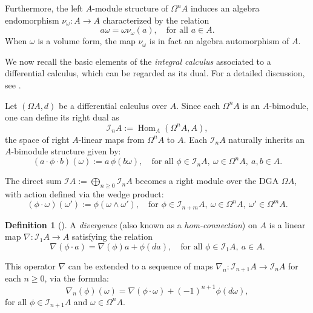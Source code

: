 \documentclass{amsart}
\theoremstyle{definition}
\newtheorem{definition}[theorem]{Definition}
\theoremstyle{remark}
\numberwithin{equation}{section}
\begin{document}
Furthermore, the left $A$-module structure of $\Omega^n A$ induces an algebra endomorphism $\nu_{\omega}: A \to A$ characterized by the relation
\begin{equation}\label{BrzezinskiSitarz20172.2}
    a \omega = \omega \nu_{\omega}(a), \quad \text{for all } a \in A.
\end{equation}
When $\omega$ is a volume form, the map $\nu_{\omega}$ is in fact an algebra automorphism of $A$.

We now recall the basic elements of the \emph{integral calculus} associated to a differential calculus, which can be regarded as its dual. For a detailed discussion, see \cite{Brzezinski2008, BrzezinskiElKaoutitLomp2010}.

Let $(\Omega A, d)$ be a differential calculus over $A$. Since each $\Omega^n A$ is an $A$-bimodule, one can define its right dual as
\[
\mathcal{I}_n A := \operatorname{Hom}_A(\Omega^n A, A),
\]
the space of right $A$-linear maps from $\Omega^n A$ to $A$. Each $\mathcal{I}_n A$ naturally inherits an $A$-bimodule structure given by:
\[
(a \cdot \phi \cdot b)(\omega) := a \, \phi(b\omega), \quad \text{for all } \phi \in \mathcal{I}_n A,\ \omega \in \Omega^n A,\ a, b \in A.
\]

The direct sum $\mathcal{I}A := \bigoplus_{n \geq 0} \mathcal{I}_n A$ becomes a right module over the DGA $\Omega A$, with action defined via the wedge product:
\begin{equation}\label{BrzezinskiSitarz2017}
    (\phi \cdot \omega)(\omega') := \phi(\omega \wedge \omega'), \quad \text{for } \phi \in \mathcal{I}_{n+m} A,\ \omega \in \Omega^n A,\ \omega' \in \Omega^m A.
\end{equation}

\begin{definition}[{\cite[Definition 2.1]{Brzezinski2008}}]
A \emph{divergence} (also known as a \emph{hom-connection}) on $A$ is a linear map $\nabla: \mathcal{I}_1 A \to A$ satisfying the relation
\begin{equation}\label{divergence-rule}
    \nabla(\phi \cdot a) = \nabla(\phi) a + \phi(da), \quad \text{for all } \phi \in \mathcal{I}_1 A,\ a \in A.
\end{equation}
\end{definition}

This operator $\nabla$ can be extended to a sequence of maps $\nabla_n: \mathcal{I}_{n+1} A \to \mathcal{I}_n A$ for each $n \geq 0$, via the formula:
\begin{equation}\label{divergence-extension}
    \nabla_n(\phi)(\omega) = \nabla(\phi \cdot \omega) + (-1)^{n+1} \phi(d\omega),
\end{equation}
for all $\phi \in \mathcal{I}_{n+1} A$ and $\omega \in \Omega^n A$.
\end{document}
